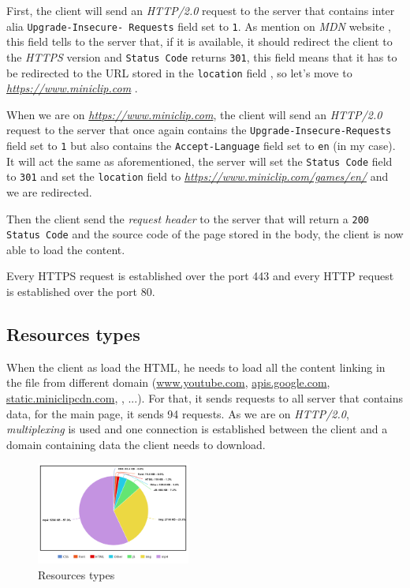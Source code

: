 \documentclass{article}
\newcommand{\link}[1]{\href{#1}{\textit{#1}}}
\begin{document}
First, the client will send an \textit{HTTP/2.0} request to the server that contains inter alia \texttt{Upgrade-Insecure- Requests} field set to \texttt{1}. As mention on \textit{MDN} website \cite{upgrade-insecure-request}, this field tells to the server that, if it is available, it should redirect the client to the \textit{HTTPS} version and \texttt{Status Code} returns \texttt{301}, this field means that it has to be redirected to the URL stored in the \texttt{location} field \cite{status-code-301}, so let's move to \link{https://www.miniclip.com} .

When we are on \link{https://www.miniclip.com}, the client will send an \textit{HTTP/2.0} request to the server that once again contains the \texttt{Upgrade-Insecure-Requests} field set to \texttt{1} but also contains the \texttt{Accept-Language} field set to \texttt{en} (in my case). It will act the same as aforementioned, the server will set the \texttt{Status Code} field to \texttt{301} and set the \texttt{location} field to \link{https://www.miniclip.com/games/en/} and we are redirected.

Then the client send the \textit{request header} to the server that will return a \texttt{200 Status Code} and the
source code of the page stored in the body, the client is now able to load the content.

Every HTTPS request is established over the port 443 and every HTTP request is established over the port 80.

\subsection{Resources types}
\label{sub:res}

When the client as load the HTML, he needs to load all the content linking in the file from different domain (\url{www.youtube.com}, \url{apis.google.com}, \url{static.miniclipcdn.com}, , ...). For that, it sends requests to all server that contains data, for the main page, it sends 94 requests. As we are on \textit{HTTP/2.0}, \textit{multiplexing} is used and one connection is established between the client and a domain containing data the client needs to download.

\begin{figure}[h]
    \centering
    \includegraphics[width=0.45\textwidth]{res/imgs/resources.png}
    \caption{Resources types}
    \label{fig:res}
\end{figure}
\end{document}
